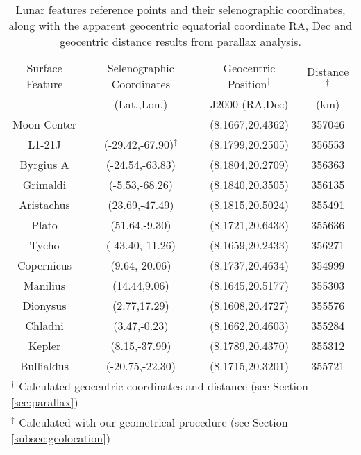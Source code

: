 
\begin{table*}
\centering
\begin{tabular}{cccc}
\hline\hline
Surface Feature & Selenographic Coordinates & Geocentric Position$^\dagger$ & Distance$^\dagger$ \\
                & (Lat.,Lon.)               & J2000 (RA,Dec)      & (km)     \\\hline
Moon Center & - & (8.1667,20.4362) & 357046\\
L1-21J & (-29.42,-67.90)$^\ddagger$ & (8.1799,20.2505) & 356553\\
Byrgius A & (-24.54,-63.83) & (8.1804,20.2709) & 356363\\
Grimaldi & (-5.53,-68.26) & (8.1840,20.3505) & 356135\\
Aristachus & (23.69,-47.49) & (8.1815,20.5024) & 355491\\
Plato & (51.64,-9.30) & (8.1721,20.6433) & 355636\\
Tycho & (-43.40,-11.26) & (8.1659,20.2433) & 356271\\
Copernicus & (9.64,-20.06) & (8.1737,20.4634) & 354999\\
Manilius & (14.44,9.06) & (8.1645,20.5177) & 355303\\
Dionysus & (2.77,17.29) & (8.1608,20.4727) & 355576\\
Chladni & (3.47,-0.23) & (8.1662,20.4603) & 355284\\
Kepler & (8.15,-37.99) & (8.1789,20.4370) & 355312\\
Bullialdus & (-20.75,-22.30) & (8.1715,20.3201) & 355721\\

\hline\hline
\multicolumn{4}{l}{\footnotesize $^\dagger$ Calculated geocentric coordinates and distance (see Section \ref{sec:parallax})}\\
\multicolumn{4}{l}{\footnotesize $^\ddagger$ Calculated with our geometrical procedure (see Section \ref{subsec:geolocation})}\\
\end{tabular}
\caption{Lunar features reference points and their selenographic coordinates, along with the apparent geocentric equatorial coordinate RA, Dec and geocentric distance results from parallax analysis.}
\label{tab:surfacefeatures}
\end{table*}
